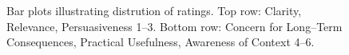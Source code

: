 \begin{figure}[t]
    \caption{Bar plots illustrating distrution of ratings. Top row: Clarity, Relevance, Persuasiveness 1–3. Bottom row: Concern for Long--Term Consequences, Practical Usefulness, Awareness of Context 4–6.}
    \label{fig:Distribution of Ratings per Dimension}
\end{figure}

